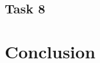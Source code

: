 \documentclass[12pt]{article}
\begin{document}
\subsection{Task 8}

\section{Conclusion}






\appendix  
\clearpage
\addappheadtotoc 
\appendixpage 
\end{document}
